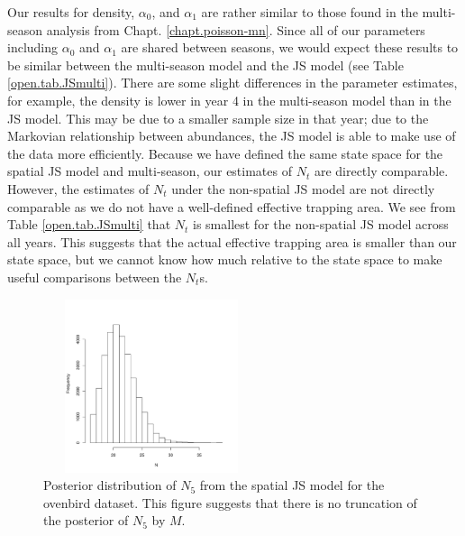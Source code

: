 Our results for density, $\alpha_0$, and $\alpha_1$ are rather similar to
those found in the multi-season analysis from
Chapt. \ref{chapt.poisson-mn}.  Since all of our parameters including
$\alpha_0$ and $\alpha_1$ are shared between seasons, we would expect these
results to be similar between the multi-season model and the JS model
(see Table \ref{open.tab.JSmulti}).  There are some slight differences
in the parameter estimates, for example, the density is lower in
year 4 in the multi-season model than in the JS model.  This may be
due to a smaller sample size in that year; 
due to the Markovian relationship between abundances, 
the JS model is able to make use of the data more efficiently.
Because we have defined the same state space for the spatial JS model
and multi-season, our estimates of $N_t$ are directly comparable.
However, the estimates of $N_t$ under the non-spatial JS model are not
directly comparable as we do not have a well-defined effective
trapping area.  We see from Table \ref{open.tab.JSmulti} that $N_t$ is
smallest for the non-spatial JS model across all years.  This suggests
that the actual effective trapping area is smaller than our state
space, but we cannot know how much relative to the state space to make
useful comparisons between the $N_t$s.

\begin{figure}
\centering
\includegraphics[height=2in,width=2.5in]{Ch16-Open/figs/Nhat5ovenbird.pdf}
\caption{Posterior distribution of $N_5$ from the spatial JS model for
  the ovenbird dataset.  This figure
suggests that there is no truncation of the posterior of $N_5$ by $M$. }
\label{open.figs.ovenbirdN5hist}
\end{figure}

